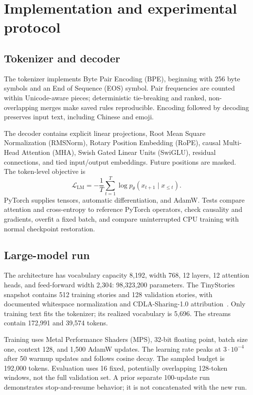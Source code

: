 \documentclass{article}
\begin{document}
\section{Implementation and experimental protocol}

\subsection{Tokenizer and decoder}

The tokenizer implements Byte Pair Encoding (BPE), beginning with 256 byte
symbols and an End of Sequence (EOS) symbol. Pair frequencies are counted
within Unicode-aware pieces; deterministic tie-breaking and ranked,
non-overlapping merges make saved rules reproducible. Encoding followed
by decoding preserves input text, including Chinese and emoji.

The decoder contains explicit linear projections, Root Mean Square
Normalization (RMSNorm), Rotary Position Embedding (RoPE), causal
Multi-Head Attention (MHA), Swish Gated Linear Units (SwiGLU), residual
connections, and tied input/output embeddings. Future positions are
masked. The token-level objective is
\begin{equation}
  \mathcal L_{\mathrm{LM}}=-\frac{1}{T}\sum_{t=1}^{T}
       \log p_\theta(x_{t+1}\mid x_{\leq t}).
\end{equation}
PyTorch supplies tensors, automatic differentiation, and AdamW.
Tests compare attention and cross-entropy to reference PyTorch
operators, check causality and gradients, overfit a fixed batch, and
compare uninterrupted CPU training with normal checkpoint restoration.

\subsection{Large-model run}

The architecture has vocabulary capacity 8,192, width 768, 12 layers,
12 attention heads, and feed-forward width 2,304: 98,323,200 parameters.
The TinyStories snapshot contains 512 training stories and 128 validation
stories, with documented whitespace normalization and
CDLA-Sharing-1.0 attribution~\citep{tinystories}.
Only training text fits the tokenizer; its realized vocabulary is 5,696.
The streams contain 172,991 and 39,574 tokens.

Training uses Metal Performance Shaders (MPS), 32-bit floating point,
batch size one, context 128, and 1,500 AdamW updates. The learning rate
peaks at $3\cdot10^{-4}$ after 50 warmup updates and follows cosine decay.
The sampled budget is 192,000 tokens. Evaluation uses 16 fixed,
potentially overlapping 128-token windows, not the full validation set.
A prior separate 100-update run demonstrates stop-and-resume behavior;
it is not concatenated with the new run.
\end{document}
